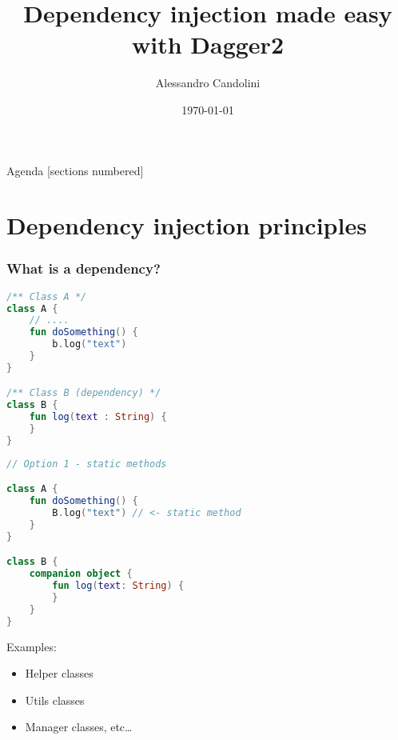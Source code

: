 \documentclass[10pt]{beamer}
\title{Dependency injection made easy with Dagger2}
\date{\today}
\author[A. Candolini]{Alessandro Candolini}
\begin{document}
\maketitle

\begin{frame}{Agenda}
  [sections numbered]
  \tableofcontents[hideallsubsections]
\end{frame}

\section{Dependency injection principles}
\begin{frame}[fragile]
	\frametitle{What is a dependency?}
		\begin{figure}
			\centering
{}
		\end{figure}
\end{frame}
\begin{frame}[fragile]
\begin{lstlisting}[language=Kotlin, basicstyle=\ttfamily]
/** Class A */
class A {
    // ....
    fun doSomething() {
        b.log("text")
    }
}

/** Class B (dependency) */
class B {
    fun log(text : String) {
    }
}
\end{lstlisting} 
\end{frame}
	\begin{frame}[fragile]
\begin{lstlisting}[language=Kotlin, basicstyle=\ttfamily]
// Option 1 - static methods 

class A {
    fun doSomething() {
        B.log("text") // <- static method
    }
}

class B {
    companion object {
        fun log(text: String) {
        }
    }
}
\end{lstlisting} 
	\end{frame}

	\begin{frame}
		Examples:
		\begin{itemize}
			\item Helper  classes
			\item Utils  classes
			\item Manager classes, etc\ldots
		\end{itemize}
	\end{frame}
\end{document}
